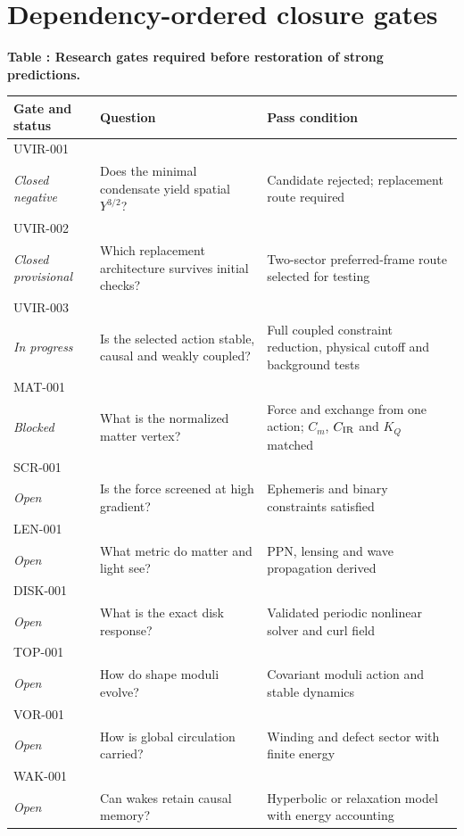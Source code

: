 \clearpage
\section{Dependency-ordered closure gates}

\begin{center}
\small
\textbf{Table \thetable: Research gates required before restoration of strong predictions.}\par\smallskip
\begin{tabular}{@{}p{}p{}p{}@{}}
\toprule
Gate and status & Question & Pass condition \\
\midrule
UVIR-001\\\textit{Closed negative} & Does the minimal condensate yield spatial $Y^{3/2}$? & Candidate rejected; replacement route required \\
UVIR-002\\\textit{Closed provisional} & Which replacement architecture survives initial checks? & Two-sector preferred-frame route selected for testing \\
UVIR-003\\\textit{In progress} & Is the selected action stable, causal and weakly coupled? & Full coupled constraint reduction, physical cutoff and background tests \\
MAT-001\\\textit{Blocked} & What is the normalized matter vertex? & Force and exchange from one action; $C_m$, $C_{\rm IR}$ and $K_Q$ matched \\
SCR-001\\\textit{Open} & Is the force screened at high gradient? & Ephemeris and binary constraints satisfied \\
LEN-001\\\textit{Open} & What metric do matter and light see? & PPN, lensing and wave propagation derived \\
DISK-001\\\textit{Open} & What is the exact disk response? & Validated periodic nonlinear solver and curl field \\
TOP-001\\\textit{Open} & How do shape moduli evolve? & Covariant moduli action and stable dynamics \\
VOR-001\\\textit{Open} & How is global circulation carried? & Winding and defect sector with finite energy \\
WAK-001\\\textit{Open} & Can wakes retain causal memory? & Hyperbolic or relaxation model with energy accounting \\

\end{tabular}
\end{center}
